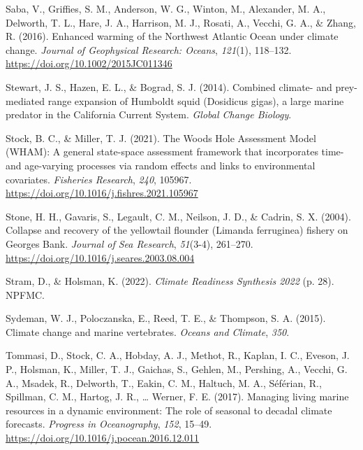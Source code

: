\documentclass[
  12pt,
]{article}
\newlength{\cslhangindent}
\newenvironment{CSLReferences}[2] %
 {\begin{list}{}{%
  \setlength{\itemindent}{0pt}
  \setlength{\leftmargin}{0pt}
  \setlength{\parsep}{0pt}
  \ifodd #1
   \setlength{\leftmargin}{\cslhangindent}
   \setlength{\itemindent}{-1\cslhangindent}
  \fi
  \setlength{\itemsep}{#2\baselineskip}}}
 {\end{list}}
\begin{document}
\begin{CSLReferences}{1}{2}
Saba, V., Griffies, S. M., Anderson, W. G., Winton, M., Alexander, M. A., Delworth, T. L., Hare, J. A., Harrison, M. J., Rosati, A., Vecchi, G. A., \& Zhang, R. (2016). Enhanced warming of the Northwest Atlantic Ocean under climate change. \emph{Journal of Geophysical Research: Oceans}, \emph{121}(1), 118--132. \url{https://doi.org/10.1002/2015JC011346}

Stewart, J. S., Hazen, E. L., \& Bograd, S. J. (2014). Combined climate- and prey-mediated range expansion of {Humboldt} squid ({Dosidicus} gigas), a large marine predator in the {California Current System}. \emph{Global Change Biology}.

Stock, B. C., \& Miller, T. J. (2021). The {Woods Hole Assessment Model} ({WHAM}): {A} general state-space assessment framework that incorporates time- and age-varying processes via random effects and links to environmental covariates. \emph{Fisheries Research}, \emph{240}, 105967. \url{https://doi.org/10.1016/j.fishres.2021.105967}

Stone, H. H., Gavaris, S., Legault, C. M., Neilson, J. D., \& Cadrin, S. X. (2004). Collapse and recovery of the yellowtail flounder (Limanda ferruginea) fishery on Georges Bank. \emph{Journal of Sea Research}, \emph{51}(3-4), 261--270. \url{https://doi.org/10.1016/j.seares.2003.08.004}

Stram, D., \& Holsman, K. (2022). \emph{Climate {Readiness Synthesis} 2022} (p. 28). NPFMC.

Sydeman, W. J., Poloczanska, E., Reed, T. E., \& Thompson, S. A. (2015). Climate change and marine vertebrates. \emph{Oceans and Climate}, \emph{350}.

Tommasi, D., Stock, C. A., Hobday, A. J., Methot, R., Kaplan, I. C., Eveson, J. P., Holsman, K., Miller, T. J., Gaichas, S., Gehlen, M., Pershing, A., Vecchi, G. A., Msadek, R., Delworth, T., Eakin, C. M., Haltuch, M. A., Séférian, R., Spillman, C. M., Hartog, J. R., \ldots{} Werner, F. E. (2017). Managing living marine resources in a dynamic environment: The role of seasonal to decadal climate forecasts. \emph{Progress in Oceanography}, \emph{152}, 15--49. \url{https://doi.org/10.1016/j.pocean.2016.12.011}


\end{CSLReferences}
\end{document}
